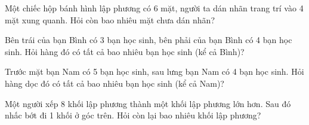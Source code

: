 \begin{ex} %
Một chiếc hộp bánh hình lập phương có 6 mặt, người ta dán nhãn trang trí vào 4 mặt xung quanh. Hỏi còn bao nhiêu mặt chưa dán nhãn?
\end{ex}

\begin{ex} %
Bên trái của bạn Bình có 3 bạn học sinh, bên phải của bạn Bình có 4 bạn học sinh. Hỏi hàng đó có tất cả bao nhiêu bạn học sinh (kể cả Bình)?
\end{ex}

\begin{ex} %
Trước mặt bạn Nam có 5 bạn học sinh, sau lưng bạn Nam có 4 bạn học sinh. Hỏi hàng dọc đó có tất cả bao nhiêu bạn học sinh (kể cả Nam)?
\end{ex}

\begin{ex} %
Một người xếp 8 khối lập phương thành một khối lập phương lớn hơn. Sau đó nhấc bớt đi 1 khối ở góc trên. Hỏi còn lại bao nhiêu khối lập phương?
\end{ex}
